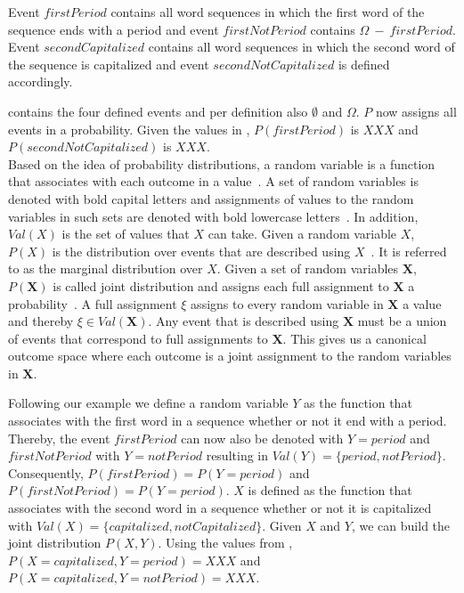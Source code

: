 Event $firstPeriod$ contains all word sequences in which the first word of the sequence ends with a period and event $firstNotPeriod$ contains $\Omega\ -\ firstPeriod$.
Event $secondCapitalized$ contains all word sequences in which the second word of the sequence is capitalized and event $secondNotCapitalized$ is defined accordingly.

 contains the four defined events and per definition also $\emptyset$ and $\Omega$.
$P$ now assigns all events in  a probability.
Given the values in , $P(firstPeriod)$ is $XXX$ and $P(secondNotCapitalized)$ is $XXX$.\\

Based on the idea of \glspl{probability distribution}, a \gls{random variable} is a \gls{function} that associates with each outcome in  a value~\cite{koller2009probabilistic}.
A set of \glspl{random variable} is denoted with bold capital letters and assignments of values to the \glspl{random variable} in such sets are denoted with bold lowercase letters~\cite{koller2009probabilistic}.
In addition, $Val(X)$ is the set of values that $X$ can take.
Given a \gls{random variable} $X$, $P(X)$ is the distribution over \glspl{event} that are described using $X$~\cite{koller2009probabilistic}.
It is referred to as the \gls{marginal distribution} over $X$.
Given a set of \glspl{random variable} $\bm{X}$, $P(\bm{X})$ is called \gls{joint distribution} and assigns each \gls{full assignment} to $\bm{X}$ a probability~\cite{koller2009probabilistic}.
A \gls{full assignment} $\xi$ assigns to every \gls{random variable} in $\bm{X}$ a value and thereby $\xi\in Val(\bm{X})$.
Any \gls{event} that is described using $\bm{X}$ must be a union of events that correspond to \glspl{full assignment} to $\bm{X}$.
This gives us a \gls{canonical outcome space} where each outcome is a joint assignment to the \glspl{random variable} in $\bm{X}$.

Following our example we define a \gls{random variable} $Y$ as the \gls{function} that associates with the first word in a sequence whether or not it end with a period.
Thereby, the \gls{event} $firstPeriod$ can now also be denoted with $Y = period$ and $firstNotPeriod$ with $Y = notPeriod$ resulting in $Val(Y)=\{period, notPeriod\}$.
Consequently, $P(firstPeriod)=P(Y=period)$ and $P(firstNotPeriod)=P(Y=period)$.
$X$ is defined as the function that associates with the second word in a sequence whether or not it is capitalized with $Val(X)=\{capitalized, notCapitalized\}$.
Given $X$ and $Y$, we can build the \gls{joint distribution} $P(X,Y)$.
Using the values from , $P(X=capitalized,Y=period)=XXX$ and $P(X=capitalized,Y=notPeriod)=XXX$.\\

